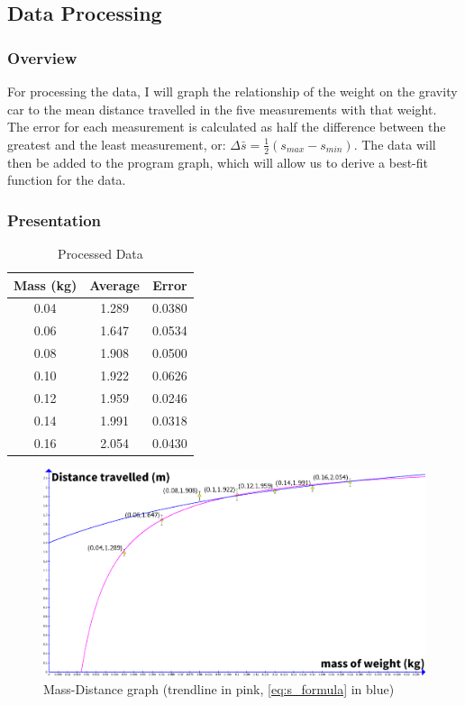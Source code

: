\documentclass[titlepage,12pt]{article}
\begin{document}
\subsection{Data Processing}

\subsubsection{Overview}

For processing the data, I will graph the relationship of the weight on the gravity car to
the mean distance travelled in the five measurements with that weight. The error for each
measurement is calculated as half the difference between the greatest and the least
measurement, or: ${\Delta \bar{s} = \frac{1}{2}(s_{max} - s_{min})}$.  The data will then be
added to the program graph, which will allow us to derive a best-fit function for the data.

\subsubsection{Presentation}

\FloatBarrier
\begin{table}[H]
    \centering
    \def\arraystretch{1.5}
    \begin{tabular}{c|c|c}
        Mass (kg) & Average & Error\\ 
        \hline
        \hline
        0.04 & 1.289 & 0.0380\\ 
        \hline
        0.06 & 1.647 & 0.0534\\ 
        \hline
        0.08 & 1.908 & 0.0500\\ 
        \hline
        0.10 & 1.922 & 0.0626\\ 
        \hline
        0.12 & 1.959 & 0.0246\\ 
        \hline
        0.14 & 1.991 & 0.0318\\ 
        \hline
        0.16 & 2.054 & 0.0430\\ 
    \end{tabular}
    \caption{Processed Data} 
    \label{table:processed data}
\end{table}

\begin{figure}[H]
    \label{fig:mass-distance-graph}
    \centering
    \includegraphics[scale=0.28]{mass-distance_graph}
    \caption{Mass-Distance graph (trendline in pink, 
        \autoref{eq:s_formula} in blue)}
\end{figure}
\end{document}
